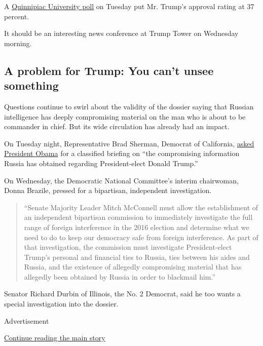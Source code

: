 A
\href{https://poll.qu.edu/national/release-detail?ReleaseID=2415}{Quinnipiac
University poll} on Tuesday put Mr. Trump's approval rating at 37
percent.

It should be an interesting news conference at Trump Tower on Wednesday
morning.

\hypertarget{a-problem-for-trump-you-cant-unsee-something}{%
\subsection{A problem for Trump: You can't unsee
something}\label{a-problem-for-trump-you-cant-unsee-something}}

Questions continue to swirl about the validity of the dossier saying
that Russian intelligence has deeply compromising material on the man
who is about to be commander in chief. But its wide circulation has
already had an impact.

On Tuesday night, Representative Brad Sherman, Democrat of California,
\href{http://sherman.house.gov/sites/sherman.house.gov/files/January\%2010\%20-\%20Letter\%20to\%20Obama.pdf}{asked
President Obama} for a classified briefing on ``the compromising
information Russia has obtained regarding President-elect Donald
Trump.''

On Wednesday, the Democratic National Committee's interim chairwoman,
Donna Brazile, pressed for a bipartisan, independent investigation.

\begin{quote}
``Senate Majority Leader Mitch McConnell must allow the establishment of
an independent bipartisan commission to immediately investigate the full
range of foreign interference in the 2016 election and determine what we
need to do to keep our democracy safe from foreign interference. As part
of that investigation, the commission must investigate President-elect
Trump's personal and financial ties to Russia, ties between his aides
and Russia, and the existence of allegedly compromising material that
has allegedly been obtained by Russia in order to blackmail him.''
\end{quote}

Senator Richard Durbin of Illinois, the No. 2 Democrat, said he too
wants a special investigation into the dossier.

\begin{quote}
\end{quote}

Advertisement

\protect\hyperlink{after-bottom}{Continue reading the main story}

